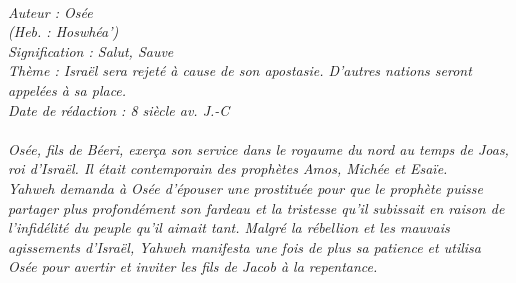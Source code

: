 \BFont
\noindent\hrulefill
{\footnotesize
\textit{
\bigskip
{\centering{}
\\Auteur : Osée
\\(Heb. : Hoswhéa')
\\Signification : Salut, Sauve
\\Thème : Israël sera rejeté à cause de son apostasie. D'autres nations seront appelées à sa place.
\\Date de rédaction : 8 siècle av. J.-C\\}
}
\textit{
\\Osée, fils de Béeri, exerça son service dans le royaume du nord au temps de Joas, roi d'Israël. Il était contemporain des prophètes Amos, Michée et Esaïe.
\\Yahweh demanda à Osée d'épouser une prostituée pour que le prophète puisse partager plus profondément son fardeau
et la tristesse qu'il subissait en raison de l'infidélité du peuple qu'il aimait tant. Malgré la rébellion et les mauvais
agissements d'Israël, Yahweh manifesta une fois de plus sa patience et utilisa Osée pour avertir et inviter les fils de Jacob à la repentance.\bigskip
}
}
\par\nobreak\noindent\hrulefill
